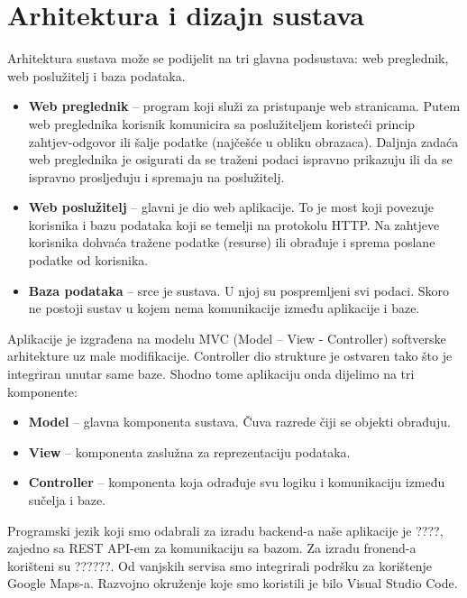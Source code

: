 \chapter{Arhitektura i dizajn sustava}
		
		Arhitektura sustava može se podijelit na tri glavna podsustava: web preglednik, web poslužitelj i baza podataka.
	\begin{itemize}
		\item 	\textbf{Web preglednik} – program koji služi za pristupanje web stranicama. Putem web preglednika korisnik komunicira sa poslužiteljem koristeći princip zahtjev-odgovor ili šalje podatke (najčešće u obliku obrazaca). Daljnja zadaća web preglednika je osigurati da se traženi podaci ispravno prikazuju ili da se ispravno prosljeđuju i spremaju na poslužitelj.
		\item 	\textbf{Web poslužitelj} – glavni je dio web aplikacije. To je most koji povezuje korisnika i bazu podataka koji se temelji na protokolu HTTP. Na zahtjeve korisnika dohvaća tražene podatke (resurse) ili obrađuje i sprema poslane podatke od korisnika.
		\item 	\textbf{Baza podataka} – srce je sustava. U njoj su pospremljeni svi podaci. Skoro ne postoji sustav u kojem nema komunikacije između aplikacije i baze.	
	\end{itemize}
		Aplikacije je izgrađena na modelu MVC (Model – View - Controller) softverske arhitekture uz male modifikacije. Controller dio strukture je ostvaren tako što je integriran unutar same baze. Shodno tome aplikaciju onda dijelimo na tri komponente:
	\begin{itemize}
		\item	\textbf{Model} – glavna komponenta sustava. Čuva razrede čiji se objekti obrađuju.
		\item	\textbf{View} – komponenta zaslužna za reprezentaciju podataka.
		\item	\textbf{Controller} – komponenta koja odrađuje svu logiku i komunikaciju između sučelja i baze.
	\end{itemize}
	
		\smallskip
		Programski jezik koji smo odabrali za izradu backend-a naše aplikacije je ????, zajedno sa REST API-em za komunikaciju sa bazom. Za izradu fronend-a korišteni su ??????. Od vanjskih servisa smo integrirali podršku za korištenje Google Maps-a. Razvojno okruženje koje smo koristili je bilo Visual Studio Code.
		

		

